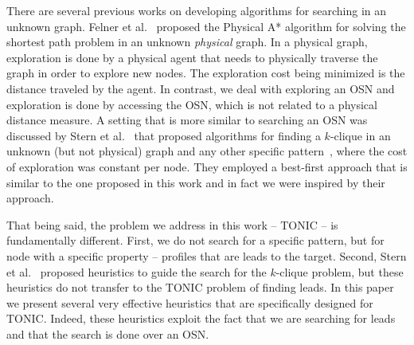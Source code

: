 \documentclass[prodmode,acmtecs]{acmsmall} %
\begin{document}

There are several previous works on developing algorithms for searching in an unknown graph. Felner et al.~ proposed the Physical A* algorithm for solving the shortest path problem in an unknown {\em physical} graph. In a physical graph, exploration is done by a physical agent that needs to physically traverse the graph in order to explore new nodes. The exploration cost being minimized is the distance traveled by the agent. 
In contrast, we deal with exploring an OSN and exploration is done by accessing the OSN, which is not related to a physical distance measure. A setting that is more similar to searching an OSN was discussed by Stern et al.~ that proposed algorithms for finding a $k$-clique in an unknown (but not physical) graph and any other specific pattern~\cite{stern2012findingPatterns}, where the cost of exploration was constant per node. They employed a best-first approach that is similar to the one proposed in this work and in fact we were inspired by their approach.

That being said, the problem we address in this work -- TONIC -- is  fundamentally different. First, we do not search for a specific pattern, but for node with a specific property -- profiles that are leads to the target. 
Second, Stern et al.~ proposed heuristics to guide the search for the $k$-clique problem, but these heuristics do not transfer to the TONIC problem of finding leads. In this paper we present several very effective heuristics that are specifically designed for TONIC. Indeed, these heuristics exploit the fact that we are searching for leads and that the search is done over an OSN. 

\end{document}
